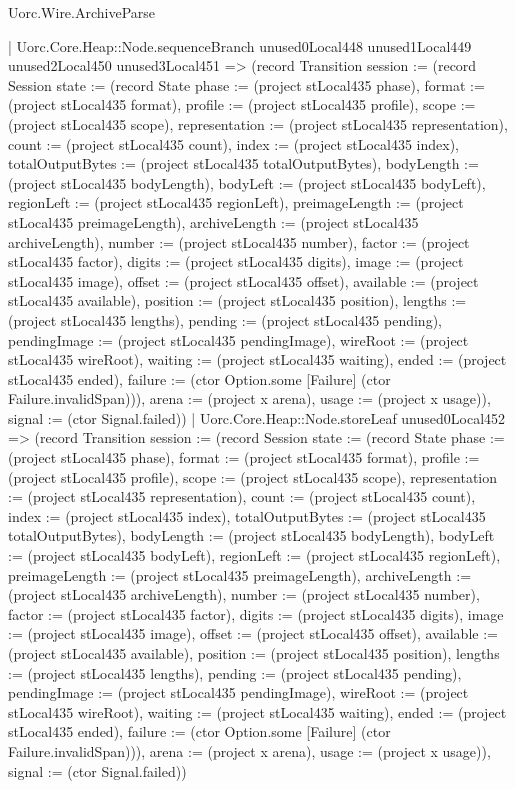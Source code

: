 \begin{lexlean}{Uorc.Wire.ArchiveParse}
\begin{semanticmodule}
{        | Uorc.Core.Heap::Node.sequenceBranch unused0Local448 unused1Local449 unused2Local450 unused3Local451 => (record Transition {session := (record Session {state := (record State {phase := (project stLocal435 phase), format := (project stLocal435 format), profile := (project stLocal435 profile), scope := (project stLocal435 scope), representation := (project stLocal435 representation), count := (project stLocal435 count), index := (project stLocal435 index), totalOutputBytes := (project stLocal435 totalOutputBytes), bodyLength := (project stLocal435 bodyLength), bodyLeft := (project stLocal435 bodyLeft), regionLeft := (project stLocal435 regionLeft), preimageLength := (project stLocal435 preimageLength), archiveLength := (project stLocal435 archiveLength), number := (project stLocal435 number), factor := (project stLocal435 factor), digits := (project stLocal435 digits), image := (project stLocal435 image), offset := (project stLocal435 offset), available := (project stLocal435 available), position := (project stLocal435 position), lengths := (project stLocal435 lengths), pending := (project stLocal435 pending), pendingImage := (project stLocal435 pendingImage), wireRoot := (project stLocal435 wireRoot), waiting := (project stLocal435 waiting), ended := (project stLocal435 ended), failure := (ctor Option.some [Failure] (ctor Failure.invalidSpan))}), arena := (project x arena), usage := (project x usage)}), signal := (ctor Signal.failed)})
        | Uorc.Core.Heap::Node.storeLeaf unused0Local452 => (record Transition {session := (record Session {state := (record State {phase := (project stLocal435 phase), format := (project stLocal435 format), profile := (project stLocal435 profile), scope := (project stLocal435 scope), representation := (project stLocal435 representation), count := (project stLocal435 count), index := (project stLocal435 index), totalOutputBytes := (project stLocal435 totalOutputBytes), bodyLength := (project stLocal435 bodyLength), bodyLeft := (project stLocal435 bodyLeft), regionLeft := (project stLocal435 regionLeft), preimageLength := (project stLocal435 preimageLength), archiveLength := (project stLocal435 archiveLength), number := (project stLocal435 number), factor := (project stLocal435 factor), digits := (project stLocal435 digits), image := (project stLocal435 image), offset := (project stLocal435 offset), available := (project stLocal435 available), position := (project stLocal435 position), lengths := (project stLocal435 lengths), pending := (project stLocal435 pending), pendingImage := (project stLocal435 pendingImage), wireRoot := (project stLocal435 wireRoot), waiting := (project stLocal435 waiting), ended := (project stLocal435 ended), failure := (ctor Option.some [Failure] (ctor Failure.invalidSpan))}), arena := (project x arena), usage := (project x usage)}), signal := (ctor Signal.failed)})
}
\end{semanticmodule}
\end{lexlean}
